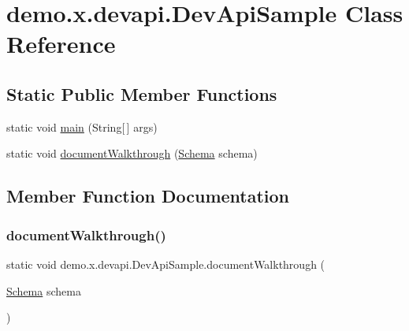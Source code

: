 \hypertarget{classdemo_1_1x_1_1devapi_1_1_dev_api_sample}{}\section{demo.\+x.\+devapi.\+Dev\+Api\+Sample Class Reference}
\label{classdemo_1_1x_1_1devapi_1_1_dev_api_sample}
\subsection*{Static Public Member Functions}
\begin{DoxyCompactItemize}
\item 
static void \mbox{\hyperlink{classdemo_1_1x_1_1devapi_1_1_dev_api_sample_a9fecf4c0145ac4788eb0768d9f1d04a4}{main}} (String\mbox{[}$\,$\mbox{]} args)
\item 
static void \mbox{\hyperlink{classdemo_1_1x_1_1devapi_1_1_dev_api_sample_ada35ae877079026b904c351d57cf454b}{document\+Walkthrough}} (\mbox{\hyperlink{interfacecom_1_1mysql_1_1cj_1_1xdevapi_1_1_schema}{Schema}} schema)
\end{DoxyCompactItemize}


\subsection{Member Function Documentation}
\mbox{\label{classdemo_1_1x_1_1devapi_1_1_dev_api_sample_ada35ae877079026b904c351d57cf454b}} 
\subsubsection{\texorpdfstring{document\+Walkthrough()}{documentWalkthrough()}}
{\footnotesize\ttfamily static void demo.\+x.\+devapi.\+Dev\+Api\+Sample.\+document\+Walkthrough (\begin{DoxyParamCaption}\item[{\mbox{\hyperlink{interfacecom_1_1mysql_1_1cj_1_1xdevapi_1_1_schema}{Schema}}}]{schema }\end{DoxyParamCaption})\hspace{0.3cm}{\ttfamily [static]}}

